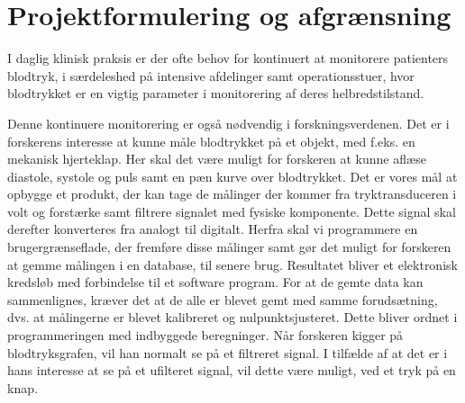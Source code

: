 \chapter{Projektformulering og afgrænsning}
I daglig klinisk praksis er der ofte behov for kontinuert at monitorere patienters blodtryk, i særdeleshed på intensive afdelinger samt operationsstuer, hvor blodtrykket er en vigtig parameter i monitorering af deres helbredstilstand.


Denne kontinuere monitorering er også nødvendig i forskningsverdenen. Det er i forskerens interesse at kunne måle blodtrykket på et objekt, med f.eks. en mekanisk hjerteklap. Her skal det være muligt for forskeren at kunne aflæse diastole, systole og puls samt en pæn kurve over blodtrykket. Det er vores mål at opbygge et produkt, der kan tage de målinger der kommer fra tryktransduceren i volt og forstærke samt filtrere signalet med fysiske komponente. Dette signal skal derefter konverteres fra analogt til digitalt. Herfra skal vi programmere en brugergrænseflade, der fremføre disse målinger samt gør det muligt for forskeren at gemme målingen i en database, til senere brug. Resultatet bliver et elektronisk kredsløb med forbindelse til et software program.
For at de gemte data kan sammenlignes, kræver det at de alle er blevet gemt med samme forudsætning, dvs. at målingerne er blevet kalibreret og nulpunktsjusteret. Dette bliver ordnet i programmeringen med indbyggede beregninger. Når forskeren kigger på blodtryksgrafen, vil han normalt se på et filtreret signal. I tilfælde af at det er i hans interesse at se på et ufilteret signal, vil dette være muligt, ved et tryk på en knap.

